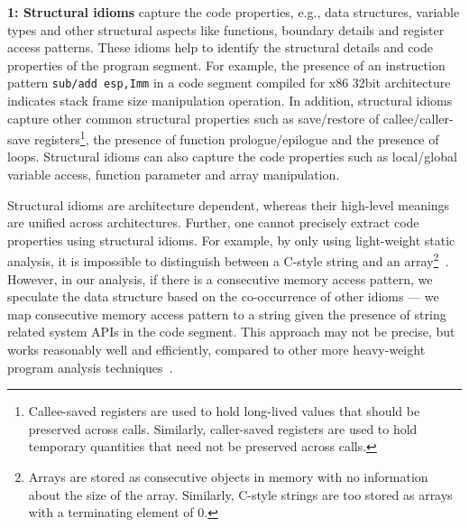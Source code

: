 %


 \noindent \textbf{1: Structural idioms} capture the code properties, e.g., data structures, variable types and other structural aspects like functions, boundary details and register access patterns.
These idioms help to identify the structural details and code properties of the program segment. For example, the presence of an instruction pattern \texttt{sub/add esp,Imm} in a code segment compiled for x86 32bit architecture indicates stack frame size manipulation operation. In addition,  structural idioms capture other common structural properties such as save/restore of callee/caller-save registers\footnote{Callee-saved registers are used to hold long-lived values that should be preserved across calls. Similarly, caller-saved registers are used to hold temporary quantities that need not be preserved across calls.}, the presence of function prologue/epilogue and the presence of loops. Structural idioms can also capture the code properties such as local/global variable access, function parameter and array manipulation.

 Structural idioms are architecture dependent, whereas their high-level meanings are unified across architectures. Further, one cannot precisely extract code properties using structural idioms. For example, by only using light-weight static analysis, it is impossible to distinguish between a C-style string and an array\footnote{Arrays are stored as consecutive objects in memory with no information about the size of the array. Similarly, C-style strings are too stored as arrays with a terminating element of 0.}~\cite{fog2009calling}. However, in our analysis, if there is a consecutive memory access pattern, we speculate the data structure based on the co-occurrence of other idioms --- we map consecutive memory access pattern to a string given the presence of string related system APIs in the code segment. This approach may not be precise, but works reasonably well and efficiently, compared to other more heavy-weight program analysis techniques~\cite{balakrishnan2007divine}.


